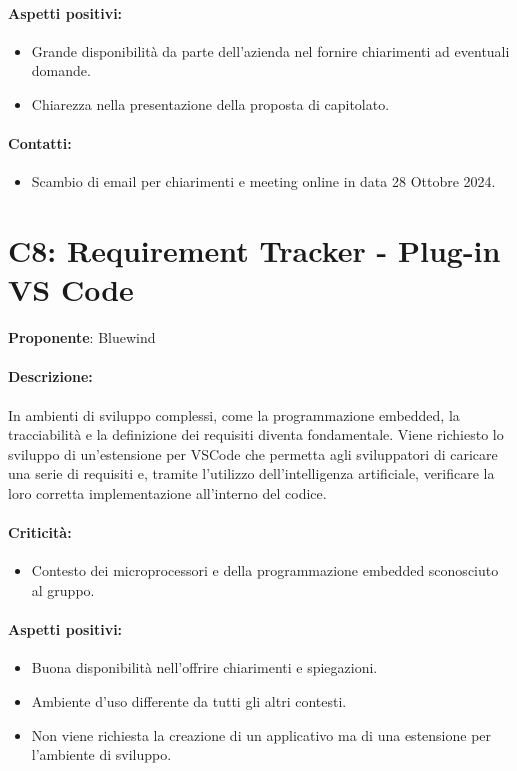 \documentclass{TWDocumentNoVersion}
\begin{document}
    \paragraph{Aspetti positivi:}
    \begin{itemize}
        \item Grande disponibilità da parte dell'azienda nel fornire chiarimenti ad eventuali domande.
        \item Chiarezza nella presentazione della proposta di capitolato.
    \end{itemize}
    \paragraph{Contatti:}
    \begin{itemize}
        \item Scambio di email per chiarimenti  e meeting online in data 28 Ottobre 2024.
    \end{itemize}

    \section*{C8: Requirement Tracker - Plug-in VS Code}
    {\textbf{Proponente}: Bluewind}
    \paragraph{Descrizione:\\}
    {In ambienti di sviluppo complessi, come la programmazione embedded, la tracciabilità e la definizione dei requisiti diventa fondamentale. Viene richiesto lo sviluppo di un'estensione per VSCode che permetta agli sviluppatori di caricare una serie di requisiti e, tramite l'utilizzo dell'intelligenza artificiale, verificare la loro corretta implementazione all'interno del codice.}
    \paragraph{Criticità:}
    \begin{itemize}
        \item Contesto dei microprocessori e della programmazione embedded sconosciuto al gruppo.
    \end{itemize}
    \paragraph{Aspetti positivi:}
    \begin{itemize}
        \item Buona disponibilità nell'offrire chiarimenti e spiegazioni.
        \item Ambiente d'uso differente da tutti gli altri contesti.
        \item Non viene richiesta la creazione di un applicativo ma di una estensione per l'ambiente di sviluppo.
    \end{itemize}
\end{document}
